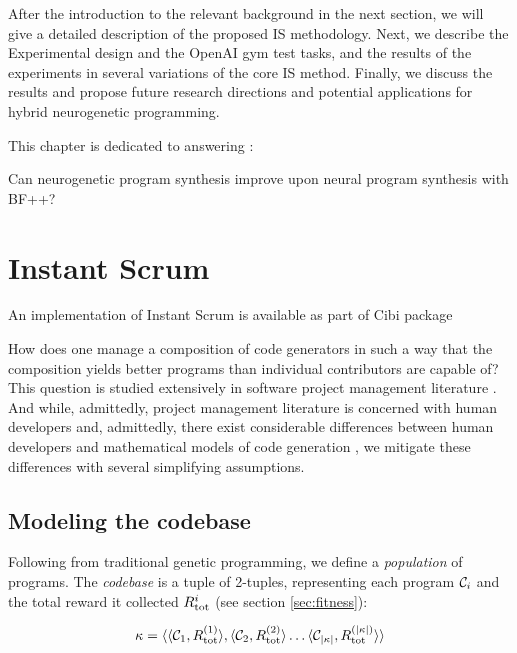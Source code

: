 After the introduction to the relevant background in the next section, we will give a detailed description of the proposed IS methodology. Next, we describe the Experimental design and the OpenAI gym test tasks, and the results of the experiments in several variations of the core IS method. Finally, we discuss the results and propose future research directions and potential applications for hybrid neurogenetic programming. 

This chapter is dedicated to answering \rqneurogen:

\begin{highlight}
    Can neurogenetic program synthesis improve upon neural program synthesis with BF++?
\end{highlight}

\newpage
\section{Instant Scrum}

\begin{remark}
    An implementation of Instant Scrum is available as part of Cibi \cite{liventsevVadim0x60Cibi2024} package
\end{remark}

How does one manage a composition of code generators in such a way that the composition yields better programs than individual contributors are capable of? 
This question is studied extensively in software project management literature \cite{brooksjrMythicalManmonthEssays1995}.
And while, admittedly, project management literature is concerned with human developers and, admittedly, there exist considerable differences between human developers and mathematical models of code generation \cite{legouesSystematicStudyAutomated2012}, we mitigate these differences with several simplifying assumptions.

\subsection{Modeling the codebase}

Following from traditional genetic programming, we define a \emph{population} of programs. 
The \emph{codebase} is a tuple of 2-tuples, representing each program $\mathcal{C}_i$ and the total reward it collected $R_\text{tot}^i$ (see section \ref{sec:fitness}):

\begin{equation}
    \kappa = \langle \langle \mathcal{C}_1, R_\text{tot}^{(1)} \rangle, \langle \mathcal{C}_2, R_\text{tot}^{(2)} \rangle \dots \langle \mathcal{C}_{|\kappa|}, R_\text{tot}^{(|\kappa|)} \rangle \rangle
\end{equation}

